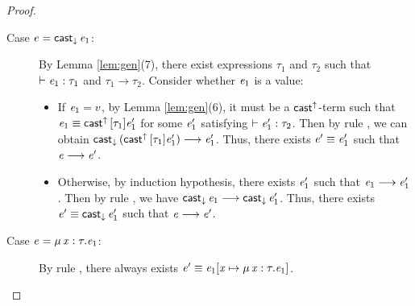 \begin{proof}
\begin{description}
\begin{itemize}
    		\end{itemize}
		\item[Case $e=\mathsf{cast}_{\downarrow} \, \mathit{e_{{\mathrm{1}}}}$:] By Lemma \ref{lem:gen}(7), there exist expressions $\tau_{{\mathrm{1}}}$ and $\tau_{{\mathrm{2}}}$ such that $\vdash  \mathit{e_{{\mathrm{1}}}}  :  \tau_{{\mathrm{1}}}$ and $\tau_{{\mathrm{1}}}  \longrightarrow  \tau_{{\mathrm{2}}}$. Consider whether $\mathit{e_{{\mathrm{1}}}}$ is a value:
		     \begin{itemize}
    		    \item If $\mathit{e_{{\mathrm{1}}}}=v$, by Lemma \ref{lem:gen}(6), it must be a $ \mathsf{cast}^{\uparrow} $-term such that $\mathit{e_{{\mathrm{1}}}}  \equiv  \mathsf{cast}^{\uparrow} \, [  \tau_{{\mathrm{1}}}  ]  \mathit{e'_{{\mathrm{1}}}}$ for some $\mathit{e'_{{\mathrm{1}}}}$ satisfying $\vdash  \mathit{e'_{{\mathrm{1}}}}  :  \tau_{{\mathrm{2}}}$. Then by rule , we can obtain $\mathsf{cast}_{\downarrow} \, (  \mathsf{cast}^{\uparrow} \, [  \tau_{{\mathrm{1}}}  ]  \mathit{e'_{{\mathrm{1}}}}  )  \longrightarrow  \mathit{e'_{{\mathrm{1}}}}$. Thus, there exists $\mathit{e'}  \equiv  \mathit{e'_{{\mathrm{1}}}}$ such that $\mathit{e}  \longrightarrow  \mathit{e'}$.
    		    \item Otherwise, by induction hypothesis, there exists $\mathit{e'_{{\mathrm{1}}}}$ such that $\mathit{e_{{\mathrm{1}}}}  \longrightarrow  \mathit{e'_{{\mathrm{1}}}}$. Then by rule , we have $\mathsf{cast}_{\downarrow} \, \mathit{e_{{\mathrm{1}}}}  \longrightarrow  \mathsf{cast}_{\downarrow} \, \mathit{e'_{{\mathrm{1}}}}$. Thus, there exists $\mathit{e'}  \equiv  \mathsf{cast}_{\downarrow} \, \mathit{e'_{{\mathrm{1}}}}$ such that $\mathit{e}  \longrightarrow  \mathit{e'}$.
    		\end{itemize}
		\item[Case $e=\mu \, \mathit{x}  :  \tau  .  \mathit{e_{{\mathrm{1}}}}$:] By rule , there always exists $\mathit{e'}  \equiv  \mathit{e_{{\mathrm{1}}}}  [  \mathit{x}  \mapsto  \mu \, \mathit{x}  :  \tau  .  \mathit{e_{{\mathrm{1}}}}  ]$.
    \end{description}
\end{proof}

